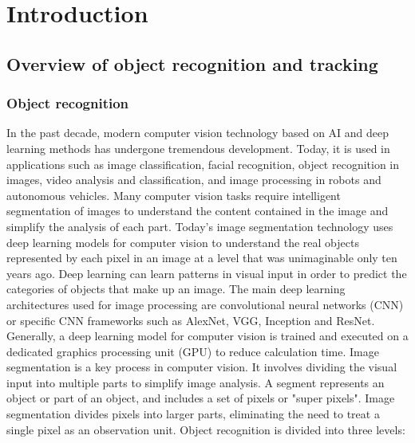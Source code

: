 \chapter{Introduction}\label{chap:intro}

\section{Overview of object recognition and tracking}
\subsection{Object recognition}
In the past decade, modern computer vision technology based on AI and deep learning methods has undergone tremendous development. Today, it is used in applications such as image classification, facial recognition, object recognition in images, video analysis and classification, and image processing in robots and autonomous vehicles. Many computer vision tasks require intelligent segmentation of images to understand the content contained in the image and simplify the analysis of each part. Today's image segmentation technology uses deep learning models for computer vision to understand the real objects represented by each pixel in an image at a level that was unimaginable only ten years ago. Deep learning can learn patterns in visual input in order to predict the categories of objects that make up an image. The main deep learning architectures used for image processing are convolutional neural networks (CNN) or specific CNN frameworks such as AlexNet, VGG, Inception and ResNet. Generally, a deep learning model for computer vision is trained and executed on a dedicated graphics processing unit (GPU) to reduce calculation time.
Image segmentation is a key process in computer vision. It involves dividing the visual input into multiple parts to simplify image analysis. A segment represents an object or part of an object, and includes a set of pixels or "super pixels". Image segmentation divides pixels into larger parts, eliminating the need to treat a single pixel as an observation unit. Object recognition is divided into three levels:
